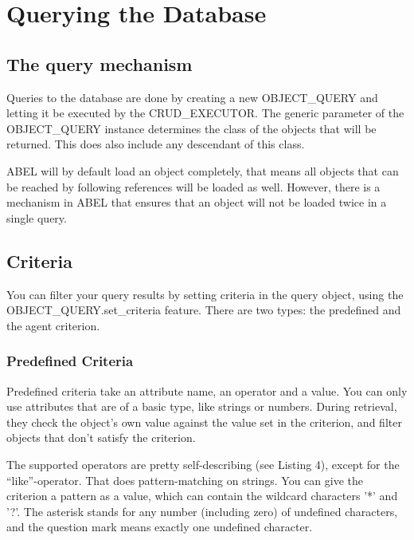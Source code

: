 \section{Querying the Database}

\subsection{The query mechanism}

Queries to the database are done by creating a new OBJECT\_QUERY and letting it be executed by the CRUD\_EXECUTOR.
The generic parameter of the OBJECT\_QUERY instance determines the class of the objects that will be returned. 
This does also include any descendant of this class.


ABEL will by default load an object completely, that means all objects that can be reached by following references will be loaded as well. 
However, there is a mechanism in ABEL that ensures that an object will not be loaded twice in a single query.


\subsection{Criteria}

You can filter your query results by setting criteria in the query object, using the OBJECT\_QUERY.set\_criteria feature.
There are two types: the predefined and the agent criterion.

\subsubsection{Predefined Criteria}
Predefined criteria take an attribute name, an operator and a value. 
You can only use attributes that are of a basic type, like strings or numbers.
During retrieval, they check the object's own value against the value set in the criterion, and filter objects that don't satisfy the criterion.

The supported operators are pretty self-describing (see Listing 4), except for the ``like''-operator. 
That does pattern-matching on strings.
You can give the criterion a pattern as a value, which can contain the wildcard characters '*' and '?'.
The asterisk stands for any number (including zero) of undefined characters, and the question mark means exactly one undefined character.

